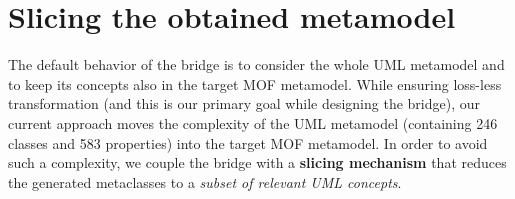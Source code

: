 \section{Slicing the obtained metamodel}\label{sec:slicing}

The default behavior of the bridge is to consider the whole UML metamodel and to keep its concepts also in the
target MOF metamodel. While ensuring loss-less transformation (and this is our primary goal while designing the bridge), our current 
approach moves the complexity of the UML metamodel (containing 246 classes and 583 properties)
into the target MOF metamodel. In order to avoid such a complexity, we couple the bridge with a \textbf{slicing mechanism} that reduces the generated metaclasses to a \textit{subset of relevant UML concepts}.

